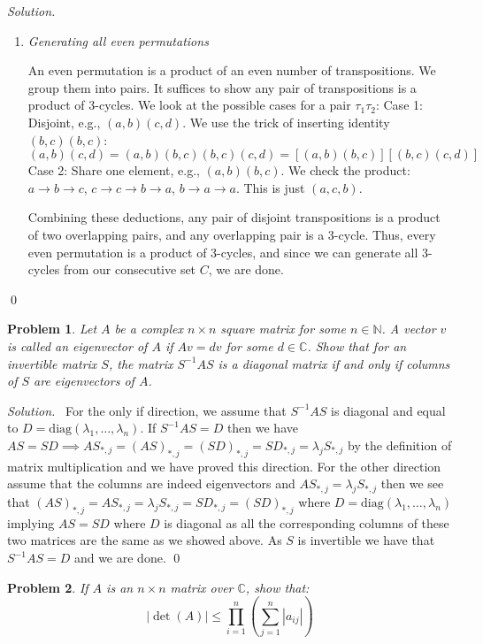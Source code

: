 \documentclass[12pt,a4paper]{article}
\newenvironment{solution}{%
  \par\noindent\textit{Solution.}\ }{\qed}
\theoremstyle{problemstyle}
\newtheorem{problem}{Problem}[section]
\def\bN{\mathbb{N}}
\begin{document}
\begin{solution}
\begin{enumerate}[label=\Roman*.]
    \item \textit{Generating all even permutations}
    
    An even permutation is a product of an even number of transpositions. We group them into pairs. It suffices to show any pair of transpositions is a product of 3-cycles.
    We look at the possible cases for a pair $\tau_1\tau_2$:
    Case 1: Disjoint, e.g., $(a, b)(c, d)$. We use the trick of inserting identity $(b, c)(b, c)$:
    $$(a, b)(c, d) = (a, b)(b, c)(b, c)(c, d) = [(a, b)(b, c)][(b, c)(c, d)]$$
    Case 2: Share one element, e.g., $(a, b)(b, c)$.
    We check the product: $a \to b \to c$, $c \to c \to b \to a$, $b \to a \to a$. This is just $(a, c, b)$.
    
    Combining these deductions, any pair of disjoint transpositions is a product of two overlapping pairs, and any overlapping pair is a 3-cycle. Thus, every even permutation is a product of 3-cycles, and since we can generate all 3-cycles from our consecutive set $C$, we are done.
    \end{enumerate}
\end{solution}
\begin{problem}\label{prob:1.5}
    Let $A$ be a complex $n\times n$ square matrix for some $n\in\bN$. A vector $v$ is called an eigenvector of $A$ if $Av = dv$ for some $d \in \mathbb{C}$. Show that for an invertible matrix $S$, the matrix $S^{-1}AS$ is a diagonal matrix if and only if columns of $S$ are eigenvectors of $A$.
\end{problem}
\begin{solution}
    For the only if direction, we assume that $S^{-1}AS$ is diagonal and equal to $D=\text{diag}(\lambda_1,\ldots,\lambda_n)$. 
    If $S^{-1}AS=D$ then we have $AS=SD\implies AS_{*,j}=(AS)_{*,j}=(SD)_{*,j}=SD_{*,j}=\lambda_jS_{*,j}$ by the definition of matrix multiplication and we have proved this direction. 
    For the other direction assume that the columns are indeed eigenvectors and $AS_{*,j}=\lambda_jS_{*,j}$ then we see that $(AS)_{*,j}=AS_{*,j}=\lambda_jS_{*,j}=SD_{*,j}=(SD)_{*,j}$ where $D=\text{diag}(\lambda_1,\ldots,\lambda_n)$ implying $AS=SD$ where $D$ is diagonal as all the corresponding columns of these two matrices are the same as we showed above. 
    As $S$ is invertible we have that $S^{-1}AS=D$ and we are done.
\end{solution}
\begin{problem}\label{prob:1.6}
    If $A$ is an $n \times n$ matrix over $\mathbb{C}$, show that:
    \[
        |\det(A)| \le \prod_{i=1}^{n} \left( \sum_{j=1}^{n} |a_{ij}| \right)
    \]
\end{problem}
\end{document}
